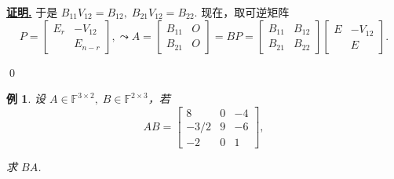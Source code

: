 \documentclass[10pt,openany]{article}
\theoremstyle{thmstyle} %
\theoremstyle{defstyle} %
\theoremstyle{prostyle} %
\theoremstyle{exastyle}
\newtheorem{example}[theorem]{例}
\theoremstyle{remstyle}
\renewenvironment{proof}[1][证明]{\par\underline{\textbf{#1.}} \;\fangsong}{\qed\par}
\newcommand{\F}{\mathbb{F}}
\begin{document}
\begin{proof}
	于是 \( B_{11}V_{12}=B_{12}, \; B_{21}V_{12}=B_{22} \). 现在，取可逆矩阵
	\[ P=\begin{bmatrix}
		E_r & -V_{12}  \\
		& E_{n-r}
	\end{bmatrix}, \leadsto A=\begin{bmatrix}
	B_{11} & O \\
	B_{21} & O
	\end{bmatrix}=BP=\begin{bmatrix}
	B_{11} & B_{12} \\
	B_{21} & B_{22}
	\end{bmatrix}\begin{bmatrix}
	E & -V_{12}  \\
	& E
	\end{bmatrix}. \]
	
	
\end{proof}


\begin{example} 
	设 \( A \in \F^{3 \times 2}, \; B \in \F^{2 \times 3} \)，若
	\[ AB=\begin{bmatrix}
	  8 & 0 & -4 \\
	  -3/2 & 9 & -6 \\
	  -2 & 0 & 1
	\end{bmatrix}, \]
	
	求 \(  BA \).
\end{example}
\end{document}
